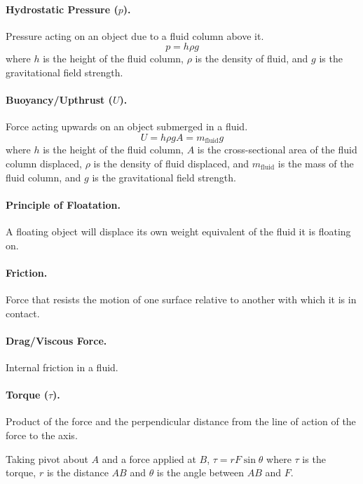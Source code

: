 \documentclass{article}
\begin{document}
\paragraph{Hydrostatic Pressure ($p$).} Pressure acting on an object due to a
fluid column above it. \begin{equation} p = h \rho g \end{equation} where $h$ is
  the height of the fluid column, $\rho$ is the density of fluid, and $g$ is the
  gravitational field strength.

\paragraph{Buoyancy/Upthrust ($U$).} Force acting upwards on an object submerged
in a fluid. \begin{equation} U = h \rho gA = m_\text{fluid}g \end{equation}
  where $h$ is the height of the fluid column, $A$ is the cross-sectional area
  of the fluid column displaced, $\rho$ is the density of fluid displaced, and
  $m_\text{fluid}$ is the mass of the fluid column, and $g$ is the gravitational
  field strength.

\paragraph{Principle of Floatation.} A floating object will displace its own
weight equivalent of the fluid it is floating on.

\paragraph{Friction.} Force that resists the motion of one surface relative to
another with which it is in contact.

\paragraph{Drag/Viscous Force.} Internal friction in a fluid.

\paragraph{Torque ($\tau$).} Product of the force and the perpendicular distance
from the line of action of the force to the axis.

Taking pivot about $A$ and a force applied at $B$, $\tau = rF\sin\theta$ where
$\tau$ is the torque, $r$ is the distance $AB$ and $\theta$ is the angle between
$AB$ and $F$.
\end{document}
